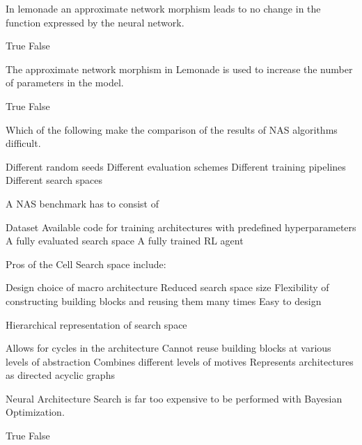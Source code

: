 \documentclass{exam}
\begin{document}
\begin{questions}
\question In lemonade an approximate network morphism leads to no change in the function expressed by the neural network.
\begin{choices}
    \choice True
    \choice False %
\end{choices}

\question The approximate network morphism in Lemonade is used to increase the number of parameters in the model.
\begin{choices}
    \choice True
    \choice False %
\end{choices}

\question Which of the following make the comparison of the results of NAS algorithms difficult.
\begin{choices} %
    \choice Different random seeds
    \choice Different evaluation schemes
    \choice Different training pipelines
    \choice Different search spaces
\end{choices}

\question A NAS benchmark has to consist of
\begin{choices}
    \choice Dataset %
    \choice Available code for training architectures with predefined hyperparameters %
    \choice A fully evaluated search space
    \choice A fully trained RL agent
\end{choices}

\question Pros of the Cell Search space include:
\begin{choices}
    \choice Design choice of macro architecture
    \choice Reduced search space size %
    \choice Flexibility of constructing building blocks and reusing them many times %
    \choice Easy to design
\end{choices}

\question Hierarchical representation of search space
\begin{choices}
    \choice Allows for cycles in the architecture
    \choice Cannot reuse building blocks at various levels of abstraction
    \choice Combines different levels of motives %
    \choice Represents architectures as directed acyclic graphs %
\end{choices}

\question Neural Architecture Search is far too expensive to be performed with Bayesian Optimization.
\begin{choices}
    \choice True
    \choice False %
\end{choices}


\end{questions}
\end{document}

